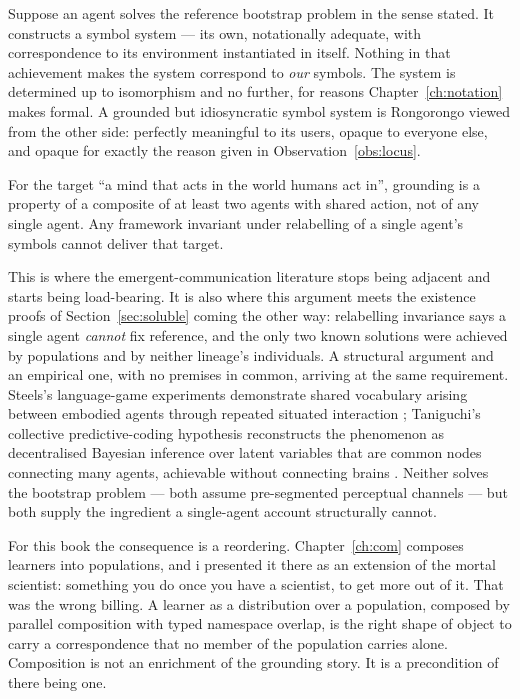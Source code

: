 Suppose an agent solves the reference bootstrap problem in the
sense stated.
It constructs a symbol system --- its own, notationally adequate,
with correspondence to its environment instantiated in itself.
Nothing in that achievement makes the system correspond to
\emph{our} symbols.
The system is determined up to isomorphism and no further, for
reasons Chapter~\ref{ch:notation} makes formal.
A grounded but idiosyncratic symbol system is Rongorongo viewed
from the other side: perfectly meaningful to its users, opaque to
everyone else, and opaque for exactly the reason given in
Observation~\ref{obs:locus}.

\begin{observation}
\label{obs:social}
For the target ``a mind that acts in the world humans act in'',
grounding is a property of a composite of at least two agents with
shared action, not of any single agent.
Any framework invariant under relabelling of a single agent's
symbols cannot deliver that target.
\end{observation}

\noindent
This is where the emergent-communication literature stops being
adjacent and starts being load-bearing.
It is also where this argument meets the existence proofs of
Section~\ref{sec:soluble} coming the other way: relabelling
invariance says a single agent \emph{cannot} fix reference, and the
only two known solutions were achieved by populations and by
neither lineage's individuals.
A structural argument and an empirical one, with no premises in
common, arriving at the same requirement.
Steels's language-game experiments demonstrate shared vocabulary
arising between embodied agents through repeated situated
interaction \cite{steels2015}; Taniguchi's collective
predictive-coding hypothesis reconstructs the phenomenon as
decentralised Bayesian inference over latent variables that are
common nodes connecting many agents, achievable without connecting
brains \cite{taniguchi2024}.
Neither solves the bootstrap problem --- both assume pre-segmented
perceptual channels --- but both supply the ingredient a
single-agent account structurally cannot.

For this book the consequence is a reordering.
Chapter~\ref{ch:com} composes learners into populations, and i
presented it there as an extension of the mortal scientist:
something you do once you have a scientist, to get more out of it.
That was the wrong billing.
A learner as a distribution over a population, composed by parallel
composition with typed namespace overlap, is the right shape of
object to carry a correspondence that no member of the population
carries alone.
Composition is not an enrichment of the grounding story.
It is a precondition of there being one.

